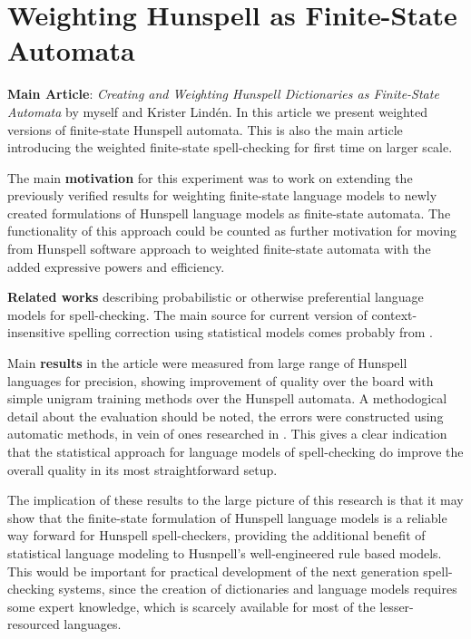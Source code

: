 \documentclass[officiallayout]{unihelcompling}
\begin{document}
\section{Weighting Hunspell as Finite-State Automata}
\label{sec:hunspell-training}

\textbf{Main Article}: \emph{Creating and Weighting Hunspell Dictionaries as Finite-State Automata} by myself and Krister Lindén. In this article we present
weighted versions of finite-state Hunspell automata. This is also the main
article introducing the weighted finite-state spell-checking for first time
on larger scale.

The main \textbf{motivation} for this experiment was to work on extending the
previously verified results for weighting finite-state language models to newly
created formulations of Hunspell language models as finite-state automata. The
functionality of this approach could be counted as further motivation for
moving from Hunspell software approach to weighted finite-state automata with
the added expressive powers and efficiency.

\textbf{Related works} describing probabilistic or otherwise preferential
language models for spell-checking. The main source for current version of 
context-insensitive spelling correction using statistical models comes
probably from \citep{church1991probability}.

Main \textbf{results} in the article were measured from large range of Hunspell
languages for precision, showing improvement of quality over the board with
simple unigram training methods over the Hunspell automata. A methodogical
detail about the evaluation should be noted, the errors were constructed using
automatic methods, in vein of ones researched in
\citep{bigert2003autoeval,bigert2005automatic}. This gives a clear indication
that the statistical approach for language models of spell-checking do improve
the overall quality in its most straightforward setup.

The implication of these results to the large picture of this research is
that it may show that the finite-state formulation of Hunspell language models
is a reliable way forward for Hunspell spell-checkers, providing the additional
benefit of statistical language modeling to Husnpell's well-engineered
rule based models. This would be important for practical development of
the next generation spell-checking systems, since the creation of dictionaries
and language models requires some expert knowledge, which is scarcely available
for most of the lesser-resourced languages.
\end{document}
